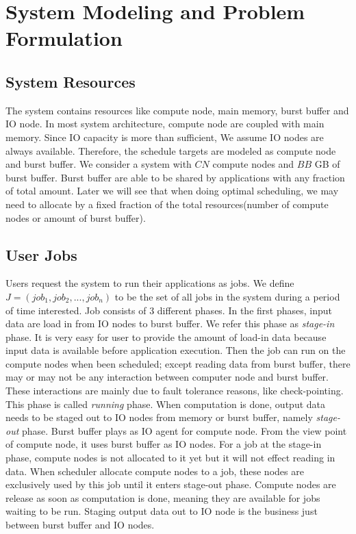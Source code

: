 \section{System Modeling and Problem Formulation}
\label{Sec:Model}

\subsection{System Resources}
The system contains resources like compute node, main memory, burst buffer and IO node.
In most system architecture, compute node are coupled with main memory.
Since IO capacity is more than sufficient, We assume IO nodes are always available.
Therefore, the schedule targets are modeled as compute node and burst buffer.
We consider a system with $CN$ compute nodes and $BB$ GB of burst buffer.
Burst buffer are able to be shared by applications with any fraction of total amount.
Later we will see that when doing optimal scheduling, we may need to allocate by a fixed
fraction of the total resources(number of compute nodes or amount of burst buffer).

\subsection{User Jobs}
Users request the system to run their applications as jobs.
We define $J = (job_1, job_2,..., job_n)$ to be the set of all jobs in the system during
a period of time interested.
Job consists of 3 different phases.
In the first phases, input data are load in from IO nodes to burst buffer.
We refer this phase as \textit{stage-in} phase.
It is very easy for user to provide the amount of load-in data because input data is available before application execution. 
Then the job can run on the compute nodes when been scheduled;
except reading data from burst buffer, there may or may not be any interaction between computer node and burst buffer.
These interactions are mainly due to fault tolerance reasons, like check-pointing.
This phase is called \textit{running} phase.
When computation is done, output data needs to be staged out to IO nodes from memory or burst buffer, namely \textit{stage-out} phase.
Burst buffer plays as IO agent for compute node.
From the view point of compute node, it uses burst buffer as IO nodes.
For a job at the stage-in phase, compute nodes is not allocated to it yet but it will not effect reading in data.
When scheduler allocate compute nodes to a job, these nodes are exclusively used by this job until it enters stage-out phase.
Compute nodes are release as soon as computation is done, meaning they are available for jobs waiting to be run.
Staging output data out to IO node is the business just between burst buffer and IO nodes.


